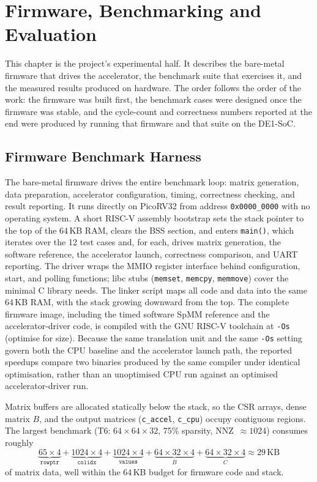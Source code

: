 \chapter{Firmware, Benchmarking and Evaluation}
\label{ch:firmware}
\label{ch:results}

This chapter is the project's experimental half. It describes the
bare-metal firmware that drives the accelerator, the benchmark suite
that exercises it, and the measured results produced on hardware. The
order follows the order of the work: the firmware was built first, the
benchmark cases were designed once the firmware was stable, and the
cycle-count and correctness numbers reported at the end were produced
by running that firmware and that suite on the DE1-SoC.

\section{Firmware Benchmark Harness}
\label{sec:harness}

The bare-metal firmware drives the entire benchmark loop: matrix
generation, data preparation, accelerator configuration, timing,
correctness checking, and result reporting. It runs directly on
PicoRV32 from address \texttt{0x0000\_0000} with no operating system.
A short RISC-V assembly bootstrap sets the stack pointer to the top of
the 64\,KB RAM, clears the BSS section, and enters \texttt{main()},
which iterates over the 12 test cases and, for each, drives matrix
generation, the software reference, the accelerator launch, correctness
comparison, and UART reporting. The driver wraps the MMIO register
interface behind configuration, start, and polling functions; libc
stubs (\texttt{memset}, \texttt{memcpy}, \texttt{memmove}) cover the
minimal C library needs. The linker script maps all code and data
into the same 64\,KB RAM, with the stack growing downward from the top.
The complete firmware image, including the timed software SpMM
reference and the accelerator-driver code, is compiled with the GNU
RISC-V toolchain at \texttt{-Os} (optimise for size). Because the
same translation unit and the same \texttt{-Os} setting govern both
the CPU baseline and the accelerator launch path, the reported
speedups compare two binaries produced by the same compiler under
identical optimisation, rather than an unoptimised CPU run against an
optimised accelerator-driver run.

Matrix buffers are allocated statically below the stack, so the CSR
arrays, dense matrix $B$, and the output matrices (\texttt{c\_accel},
\texttt{c\_cpu}) occupy contiguous regions. The largest benchmark
(T6: $64 \times 64 \times 32$, 75\% sparsity, NNZ~$\approx 1024$)
consumes roughly
\[
  \underbrace{65 \times 4}_{\texttt{rowptr}} +
  \underbrace{1024 \times 4}_{\texttt{colidx}} +
  \underbrace{1024 \times 4}_{\texttt{values}} +
  \underbrace{64 \times 32 \times 4}_{B} +
  \underbrace{64 \times 32 \times 4}_{C} \approx 29\,\text{KB}
\]
of matrix data, well within the 64\,KB budget for firmware code and stack.

